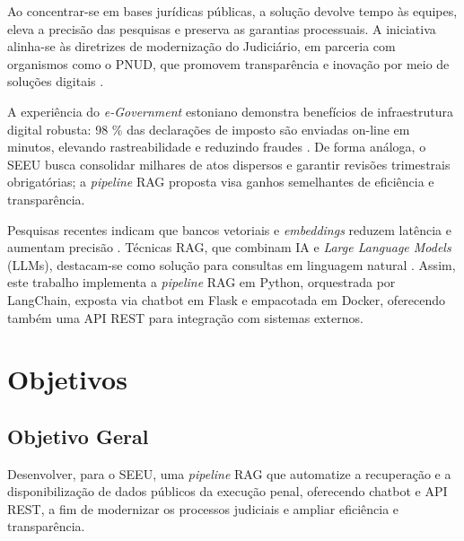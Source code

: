 Ao concentrar-se em bases jurídicas públicas, a solução devolve tempo às
equipes, eleva a precisão das pesquisas e preserva as garantias processuais.
A iniciativa alinha-se às diretrizes de modernização do Judiciário, em
parceria com organismos como o PNUD, que promovem transparência e inovação por
meio de soluções digitais \cite{undp2025pnudcnj}.

A experiência do \emph{e-Government} estoniano demonstra benefícios de
infraestrutura digital robusta: 98 \% das declarações de imposto são enviadas
on-line em minutos, elevando rastreabilidade e reduzindo fraudes
\cite{divald2021eformalization}. De forma análoga, o SEEU busca consolidar
milhares de atos dispersos e garantir revisões trimestrais obrigatórias; a
\emph{pipeline} RAG proposta visa ganhos semelhantes de eficiência e
transparência.

Pesquisas recentes indicam que bancos vetoriais e \emph{embeddings} reduzem
latência e aumentam precisão \cite{taipalus2024vector,gao2023survey}. Técnicas
RAG, que combinam IA e \emph{Large Language Models} (LLMs), destacam-se como
solução para consultas em linguagem natural \cite{qwak2024integrating,
pujiono2024implementing}. Assim, este trabalho implementa a \emph{pipeline}
RAG em Python, orquestrada por LangChain, exposta via chatbot em Flask e
empacotada em Docker, oferecendo também uma API REST para integração com
sistemas externos.


\section{Objetivos}
\label{sec:objetivos}

\subsection{Objetivo Geral}
Desenvolver, para o SEEU, uma \emph{pipeline} RAG que automatize a recuperação
e a disponibilização de dados públicos da execução penal, oferecendo chatbot e
API REST, a fim de modernizar os processos judiciais e ampliar eficiência e
transparência.

